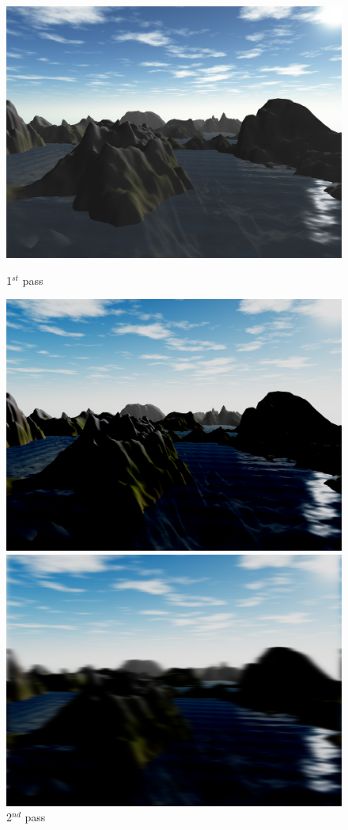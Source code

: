 \documentclass[11pt,a4paper,twoside,openright]{report}
\begin{document}
\begin{figure}[!htb]
  \includegraphics[width=\linewidth]{shader0-no-effect-screenshot.png}
  \caption{1$^{st}$ pass}\label{fig:1stpass}
\endminipage
{}
  \includegraphics[width=\linewidth]{shader1-brightpass-screenshot.png}
  \caption{2$^{nd}$ pass}\label{fig:2ndpass}
\endminipage
{}%
  \includegraphics[width=\linewidth]{shader2-horizontal-blur-screenshot.png}

\end{figure}
\end{document}
